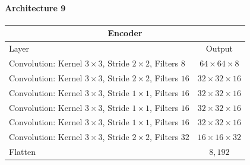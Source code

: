 \paragraph{Architecture 9}

\begin{center}
    \begin{table}[H]
        \centering
        \begin{tabular}{ | l | c | }
            \multicolumn{2}{c}{Encoder} \\ \hline
            Layer & Output\\ \hline
            Convolution: Kernel $3\times3$, Stride $2\times2$, Filters $8  $    & $64\times 64\times 8  $    \\  
            Convolution: Kernel $3\times3$, Stride $2\times2$, Filters $16 $    & $32\times 32\times 16 $    \\
            Convolution: Kernel $3\times3$, Stride $1\times1$, Filters $16 $    & $32\times 32\times 16 $    \\
            Convolution: Kernel $3\times3$, Stride $1\times1$, Filters $16 $    & $32\times 32\times 16 $    \\
            Convolution: Kernel $3\times3$, Stride $1\times1$, Filters $16 $    & $32\times 32\times 16 $    \\
            Convolution: Kernel $3\times3$, Stride $2\times2$, Filters $32 $    & $16\times 16\times 32 $    \\
            Flatten                                                             & $8,192$                    \\
            \hline
        \end{tabular}
    \end{table}
\end{center}
\vspace{-4em}
